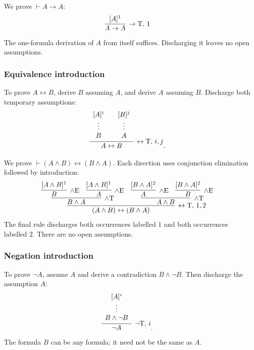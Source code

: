 \documentclass[11pt,a4paper]{amsart}
\begin{document}
\begin{example}[Identity]
  We prove \(\vdash A\to A\):
  \[
    \infer[\to\mathrm T,\,1]{A\to A}{[A]^1}
  \]
  The one-formula derivation of \(A\) from itself suffices. Discharging it
  leaves no open assumptions.
\end{example}

\subsubsection{Equivalence introduction}

To prove \(A\leftrightarrow B\), derive \(B\) assuming \(A\), and derive
\(A\) assuming \(B\). Discharge both temporary assumptions:
\[
  \infer[\leftrightarrow\mathrm T,\,i,j]{A\leftrightarrow B}{
    \begin{array}{c}[A]^i\\\vdots\\B
    \end{array}
    &
    \begin{array}{c}[B]^j\\\vdots\\A
  \end{array}}.
\]

\begin{samepage}
  \begin{example}
    We prove \(\vdash (A\land B)\leftrightarrow(B\land A)\).
    Each direction uses conjunction elimination followed by introduction:
    \[
      \infer[\leftrightarrow\mathrm T,\,1,2]
      {(A\land B)\leftrightarrow(B\land A)}{
        \infer[\land\mathrm T]{B\land A}{
          \infer[\land\mathrm E]{B}{[A\land B]^1}
        & \infer[\land\mathrm E]{A}{[A\land B]^1}}
        & \infer[\land\mathrm T]{A\land B}{
          \infer[\land\mathrm E]{A}{[B\land A]^2}
      & \infer[\land\mathrm E]{B}{[B\land A]^2}}}
    \]
    The final rule discharges both occurrences labelled \(1\) and both
    occurrences labelled \(2\). There are no open assumptions.
  \end{example}

\end{samepage}

\subsubsection{Negation introduction}

To prove \(\neg A\), assume \(A\) and derive a contradiction
\(B\land\neg B\). Then discharge the assumption \(A\):
\[
  \infer[\neg\mathrm T,\,i]{\neg A}{
    \begin{array}{c}[A]^i\\\vdots\\B\land\neg B
  \end{array}}.
\]
The formula \(B\) can be any formula; it need not be the same as \(A\).
\end{document}
